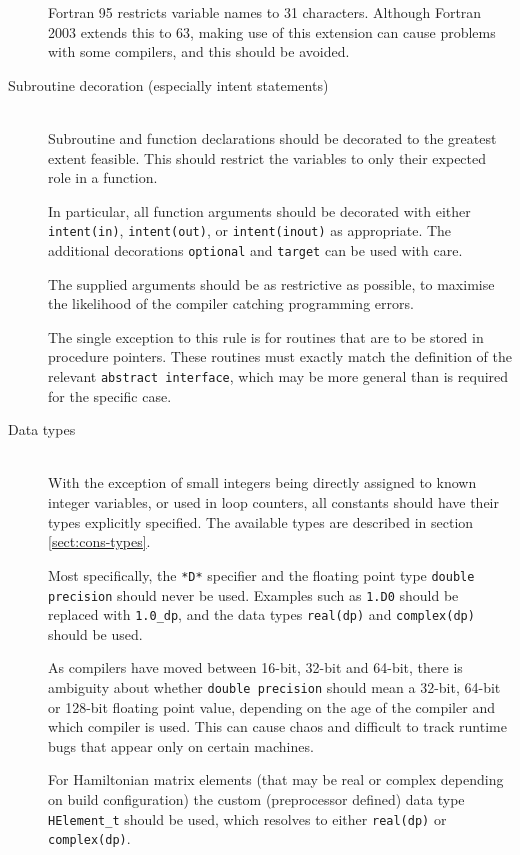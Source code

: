 \documentclass[a4paper,notitlepage]{scrreprt}
\newcommand\headitem[1]{\needspace{1.5\baselineskip}\item[{\boldmath #1 \nopagebreak}] \hfill \\ \nopagebreak}
\let\code\lstinline
\begin{document}
\begin{description}
		Fortran 95 restricts variable names to 31 characters. Although
		Fortran 2003 extends this to 63, making use of this extension can cause
		problems with some compilers, and this should be avoided.

	\headitem{Subroutine decoration (especially intent statements)}
		Subroutine and function declarations should be decorated to the
		greatest extent feasible. This should restrict the variables to only
		their expected role in a function.

		In particular, all function arguments should be decorated with either
		\code{intent(in)}, \code{intent(out)}, or
		\code{intent(inout)} as appropriate. The additional decorations
		\code{optional} and \code{target} can be used with care.

		The supplied arguments should be as restrictive as possible, to
		maximise the likelihood of the compiler catching programming errors.

		The single exception to this rule is for routines that are to be
		stored in procedure pointers. These routines must exactly match the
		definition of the relevant \code{abstract interface}, which may
		be more general than is required for the specific case.

	\headitem{Data types}
		With the exception of small integers being directly assigned to known
		integer variables, or used in loop counters, all constants should have
		their types explicitly specified. The available types are described
		in section \ref{sect:cons-types}.

		Most specifically, the \code{*D*} specifier and the floating
		point type \code{double precision} should never be used. Examples
		such as \code{1.D0} should be replaced with \code{1.0_dp},
		and the data types \code{real(dp)} and \code{complex(dp)}
		should be used.

		As compilers have moved between 16-bit, 32-bit and 64-bit, there is
		ambiguity about whether \code{double precision} should mean a
		32-bit, 64-bit or 128-bit floating point value, depending on the age
		of the compiler and which compiler is used. This can cause chaos and
		difficult to track runtime bugs that appear only on certain machines.

		For Hamiltonian matrix elements (that may be real or complex depending
		on build configuration) the custom (preprocessor defined) data type
		\code{HElement_t} should be used, which resolves to either
		\code{real(dp)} or \code{complex(dp)}.



\end{description}
\end{document}
